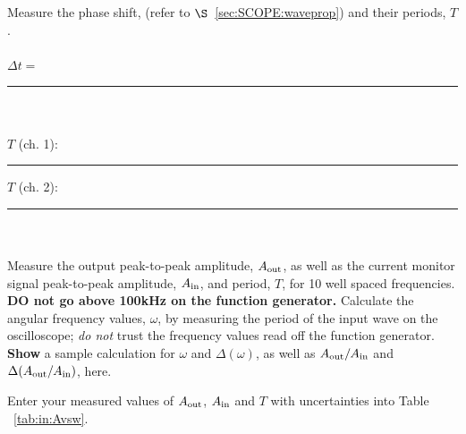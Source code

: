 \noindent Measure the phase shift, %
(refer to $\S$~\ref{sec:SCOPE:waveprop}) and their periods, $T$. \\
\ \\
\noindent $\Delta t = $\rule{3cm}{.1mm} \\
\ \\
$T$ (ch. 1): \rule{3cm}{.1mm} \hspace*{1cm} $T$ (ch. 2): 
\rule{3cm}{.1mm} \\
\ \\

\noindent Measure the output peak-to-peak amplitude, $A_{\rm{out}}$, as
well as the current monitor signal peak-to-peak amplitude, $A_{\rm{in}}$,
and period, $T$, for 10 well spaced frequencies.
{\bf DO not go above 100kHz on the function generator.} Calculate the angular
frequency values, $\omega$, by measuring the period of the input wave on 
the oscilloscope; {\it do not} trust the frequency values read off the
function generator. {\bf Show} a sample calculation for $\omega$ and
$\Delta(\omega)$, as well as $A_{\rm{out}}/A_{\rm{in}}$ and
$\Delta(A_{\rm{out}}/A_{\rm{in}})$, here.\\
\vfill
\pagebreak

\noindent Enter your measured values of $A_{\rm{out}}$, $A_{\rm{in}}$ and
$T$ with uncertainties into Table ~\ref{tab:in:Avsw}.

